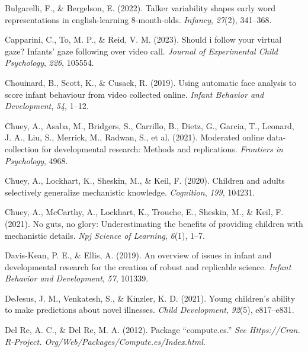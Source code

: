 \documentclass[
  man,floatsintext]{apa6}
\newlength{\cslhangindent}
\newlength{\cslentryspacingunit} %
\newenvironment{CSLReferences}[2] %
 {%
  \setlength{\parindent}{0pt}
  \ifodd #1
  \let\oldpar\par
  \def\par{\hangindent=\cslhangindent\oldpar}
  \fi
  \setlength{\parskip}{#2\cslentryspacingunit}
 }%
 {}
\begin{document}
\begin{CSLReferences}{1}{0}
\leavevmode{}%
Bulgarelli, F., \& Bergelson, E. (2022). Talker variability shapes early word representations in english-learning 8-month-olds. \emph{Infancy}, \emph{27}(2), 341--368.

\leavevmode{}%
Capparini, C., To, M. P., \& Reid, V. M. (2023). Should i follow your virtual gaze? Infants' gaze following over video call. \emph{Journal of Experimental Child Psychology}, \emph{226}, 105554.

\leavevmode{}%
Chouinard, B., Scott, K., \& Cusack, R. (2019). Using automatic face analysis to score infant behaviour from video collected online. \emph{Infant Behavior and Development}, \emph{54}, 1--12.

\leavevmode{}%
Chuey, A., Asaba, M., Bridgers, S., Carrillo, B., Dietz, G., Garcia, T., Leonard, J. A., Liu, S., Merrick, M., Radwan, S., et al. (2021). Moderated online data-collection for developmental research: Methods and replications. \emph{Frontiers in Psychology}, 4968.

\leavevmode{}%
Chuey, A., Lockhart, K., Sheskin, M., \& Keil, F. (2020). Children and adults selectively generalize mechanistic knowledge. \emph{Cognition}, \emph{199}, 104231.

\leavevmode{}%
Chuey, A., McCarthy, A., Lockhart, K., Trouche, E., Sheskin, M., \& Keil, F. (2021). No guts, no glory: Underestimating the benefits of providing children with mechanistic details. \emph{Npj Science of Learning}, \emph{6}(1), 1--7.

\leavevmode{}%
Davis-Kean, P. E., \& Ellis, A. (2019). An overview of issues in infant and developmental research for the creation of robust and replicable science. \emph{Infant Behavior and Development}, \emph{57}, 101339.

\leavevmode{}%
DeJesus, J. M., Venkatesh, S., \& Kinzler, K. D. (2021). Young children's ability to make predictions about novel illnesses. \emph{Child Development}, \emph{92}(5), e817--e831.

\leavevmode{}%
Del Re, A. C., \& Del Re, M. A. (2012). Package {``compute.es.''} \emph{See Https://Cran. R-Project. Org/Web/Packages/Compute.es/Index.html}.


\end{CSLReferences}
\end{document}
